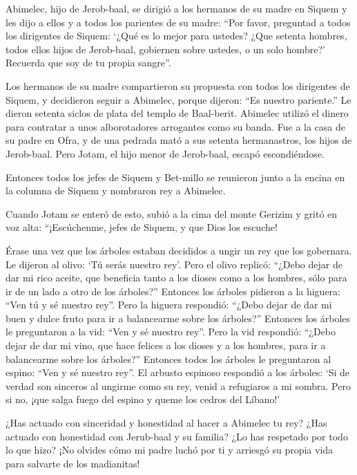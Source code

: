  Abimelec, hijo de Jerob-baal, se dirigió a los hermanos de
su madre en Siquem y les dijo a ellos y a todos los parientes de su
madre:  ``Por favor, preguntad a todos los dirigentes de
Siquem: `¿Qué es lo mejor para ustedes? ¿Que setenta hombres, todos
ellos hijos de Jerob-baal, gobiernen sobre ustedes, o un solo hombre?'
Recuerda que soy de tu propia sangre''.

 Los hermanos de su madre compartieron su propuesta con
todos los dirigentes de Siquem, y decidieron seguir a Abimelec, porque
dijeron: ``Es nuestro pariente.''  Le dieron setenta siclos
de plata del templo de Baal-berit. Abimelec utilizó el dinero para
contratar a unos alborotadores arrogantes como su banda. 
Fue a la casa de su padre en Ofra, y de una pedrada mató a sus setenta
hermanastros, los hijos de Jerob-baal. Pero Jotam, el hijo menor de
Jerob-baal, escapó escondiéndose.

 Entonces todos los jefes de Siquem y Bet-millo se reunieron
junto a la encina en la columna de Siquem y nombraron rey a Abimelec.

 Cuando Jotam se enteró de esto, subió a la cima del monte
Gerizim y gritó en voz alta: ``¡Escúchenme, jefes de Siquem, y que Dios
los escuche!

 Érase una vez que los árboles estaban decididos a ungir un
rey que los gobernara. Le dijeron al olivo: `Tú serás nuestro rey'.
 Pero el olivo replicó: ``¿Debo dejar de dar mi rico aceite,
que beneficia tanto a los dioses como a los hombres, sólo para ir de un
lado a otro de los árboles?''  Entonces los árboles
pidieron a la higuera: ``Ven tú y sé nuestro rey''.  Pero
la higuera respondió: ``¿Debo dejar de dar mi buen y dulce fruto para ir
a balancearme sobre los árboles?''  Entonces los árboles le
preguntaron a la vid: ``Ven y sé nuestro rey''.  Pero la
vid respondió: ``¿Debo dejar de dar mi vino, que hace felices a los
dioses y a los hombres, para ir a balancearme sobre los árboles?''
 Entonces todos los árboles le preguntaron al espino: ``Ven
y sé nuestro rey''.  El arbusto espinoso respondió a los
árboles: `Si de verdad son sinceros al ungirme como su rey, venid a
refugiaros a mi sombra. Pero si no, ¡que salga fuego del espino y queme
los cedros del Líbano!'

 ¿Has actuado con sinceridad y honestidad al hacer a
Abimelec tu rey? ¿Has actuado con honestidad con Jerub-baal y su
familia? ¿Lo has respetado por todo lo que hizo?  ¡No
olvides cómo mi padre luchó por ti y arriesgó su propia vida para
salvarte de los madianitas!

